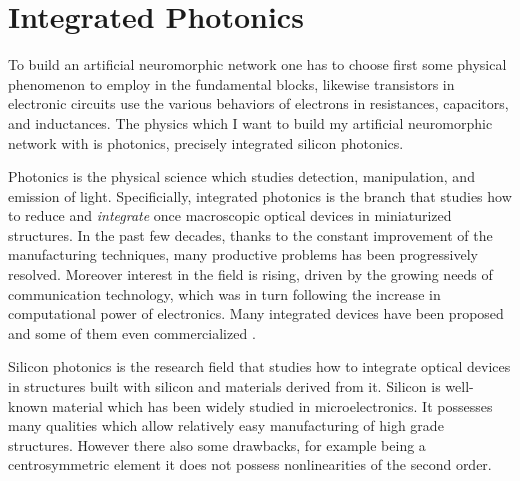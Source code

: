 \chapter{Integrated Photonics}
\label{ch:Integrated_Photonics}

To build an artificial neuromorphic network one has to choose first some physical phenomenon to employ in the fundamental blocks, likewise transistors in electronic circuits use the various behaviors of electrons in resistances, capacitors, and inductances.
The physics which I want to build my artificial neuromorphic network with is photonics, precisely integrated silicon photonics.

Photonics is the physical science which studies detection, manipulation, and emission of light.
Specificially, integrated photonics is the branch that studies how to reduce and \textit{integrate} once macroscopic optical devices in miniaturized structures.
In the past few decades, thanks to the constant improvement of the manufacturing techniques, many productive problems has been progressively resolved.
Moreover interest in the field is rising, driven by the growing needs of communication technology, which was in turn following the increase in computational power of electronics.
Many integrated devices have been proposed \cite{??} and some of them even commercialized \cite{??} .

Silicon photonics is the research field that studies how to integrate optical devices in structures built with silicon and materials derived from it.
Silicon is well-known material which has been widely studied in microelectronics.
It possesses many qualities which allow relatively easy manufacturing of high grade structures.
However there also some drawbacks, for example being a centrosymmetric element it does not possess nonlinearities of the second order.


